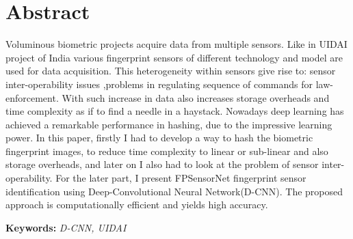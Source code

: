 \chapter*{Abstract}
\label{abstract}
Voluminous biometric projects acquire data from multiple sensors. Like in UIDAI project of India various fingerprint sensors of different technology and model are used for data acquisition.  This heterogeneity within sensors give rise to: sensor inter-operability issues ,problems in regulating sequence of commands for law-enforcement. With such increase in data also increases storage overheads and time complexity as if to find a needle in a haystack.
Nowadays deep learning has achieved a remarkable performance in hashing, due to the impressive learning power. In this paper, firstly I had to develop a way to hash the biometric fingerprint images, to reduce time complexity to linear or sub-linear and also storage overheads, and later on I also had to look at the problem of sensor inter-operability. For the later part, I present FPSensorNet fingerprint sensor identification using Deep-Convolutional Neural Network(D-CNN). The proposed approach is computationally efficient and yields high accuracy.
  

{\bf Keywords:} {\em D-CNN, UIDAI}